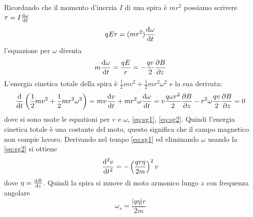 \begin{Es}
  Ricordando che il momento d'inerzia $I$ di una spira è $mr^2$ possiamo scrivere $\tau=I\frac{\mathrm{d}\omega}{\mathrm{d} t}$
  \begin{equation}
    qEr = (m r^2)\frac{\mathrm{d}\omega}{\mathrm{d} t}
  \end{equation}
  l'equazione per $\omega$ diventa
  \begin{equation}
    m\frac{\mathrm{d}\omega}{\mathrm{d} t} = \frac{qE}{r} = -\frac{qv}{2}\frac{\partial B}{\partial z}
    \label{eq:sg2}
  \end{equation}
  L'energia cinetica totale della spira è $\frac{1}{2}mv^2+\frac{1}{2}mr^2\omega^2$ e la sua derivata:
  \begin{equation}
    \frac{\mathrm{d}}{\mathrm{d} t}\left(\frac{1}{2}mv^2+\frac{1}{2}mr^2\omega^2\right) = mv\frac{\mathrm{d} v}{\mathrm{d} t} + mr^2\omega\frac{\mathrm{d}\omega}{\mathrm{d} t} = v \frac{q\omega r^2}{2}\frac{\partial B}{\partial z} - r^2\omega \frac{qv}{2}\frac{\partial B}{\partial z} = 0
  \end{equation}
  dove si sono usate le equationi per $v$ e $\omega$, \eqref{eq:sg1}, \eqref{eq:sg2}. Quindi l'energia cinetica totale è una costante del moto, questo significa che il campo magnetico non compie lavoro. Derivando nel tempo \eqref{eq:sg1} ed eliminando $\omega$ usando la \eqref{eq:sg2} si ottiene
  \begin{equation}
    \frac{\mathrm{d}^2 v}{\mathrm{d} t^2} = -\left(\frac{q r \eta}{2m}\right)^2 v
  \end{equation}
  dove $\eta=\frac{\mathrm{d} B}{\mathrm{d} z}$. Quindi la spira si muove di moto armonico lungo $z$ con frequenza angolare
  \begin{equation}
    \omega_s = \frac{|q\eta| r}{2m}
  \end{equation}


\end{Es}
